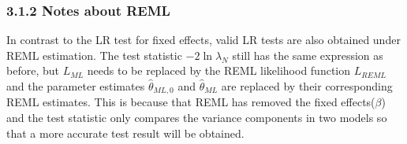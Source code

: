 \documentclass[12pt]{article}
\begin{document}
\subsubsection*{3.1.2 Notes about REML}
    In contrast to the LR test for fixed effects, valid LR tests are also obtained under REML estimation. The test statistic $-2\ln{\lambda_N}$ still has the same expression as before, but $L_{ML}$ needs to be replaced by the REML likelihood function $L_{REML}$ and the parameter estimates $\hat{\theta}_{ML,0}$ and $\hat{\theta}_{ML}$ are replaced by their corresponding REML estimates. This is because that REML has removed the fixed effects($\beta$) and the test statistic only compares the variance components in two models so that a more accurate test result will be obtained. 
\end{document}
